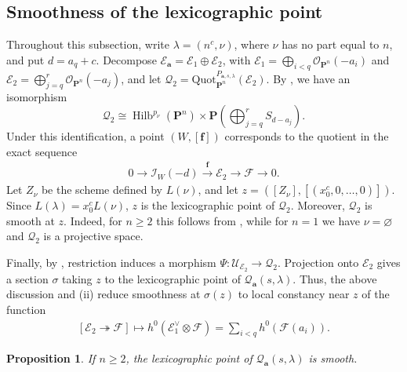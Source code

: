 \documentclass[leqno,11pt,a4paper]{amsart}
\newtheorem{prop}[prop]{Proposition}
\theoremstyle{definition}
\numberwithin{equation}{section}
\newcommand{\bfa}{\mathbf{a}}
\newcommand{\Quot}{\mathrm{Quot}}
\newcommand{\PP}{\mathbf{P}}
\newcommand{\bff}{\boldsymbol{f}}
\newcommand{\EE}{\mathscr{E}}
\newcommand{\FF}{\mathscr{F}}
\newcommand{\OO}{\mathscr{O}}
\newcommand{\II}{\mathscr{I}}
\newcommand{\QQ}{\mathcal{Q}}
\newcommand{\UU}{\mathcal{U}}
\DeclareMathOperator{\Hilb}{Hilb}
\begin{document}
\subsection{Smoothness of the lexicographic point}
Throughout this subsection, write $\lambda=(n^c,\nu)$, where $\nu$ has no part equal to $n$, and put $d=a_q+c$. 
Decompose $\EE_{\bfa}=\EE_1\oplus\EE_2$, with $\EE_1=\bigoplus_{i<q}\OO_{\PP^n}(-a_i)$ and $\EE_2=\bigoplus_{j=q}^r\OO_{\PP^n}(-a_j)$, and let $\QQ_2=\Quot_{\PP^n}^{P_{\bfa,s,\lambda}}(\EE_2)$.
By , we have an isomorphism
$$
\QQ_2\cong \Hilb^{p_\nu}(\PP^n)\times \PP\left(\bigoplus_{j=q}^r S_{d-a_j}\right).
$$
Under this identification, a point $(W,[\bff])$ corresponds to the quotient in the exact sequence
\begin{align} \label{quot_prod}
0\longrightarrow\II_W(-d) \xrightarrow{\bff}\EE_2 \longrightarrow\FF\longrightarrow0.
\end{align}
Let $Z_\nu$ be the scheme defined by $L(\nu)$, and let $z=([Z_\nu],[(x_0^c,0,\ldots,0)])$.
Since $L(\lambda)=x_0^cL(\nu)$, $z$ is the lexicographic point of $\QQ_2$.
Moreover, $\QQ_2$ is smooth at $z$. 
Indeed, for $n\geq2$ this follows from , while for $n=1$ we have $\nu=\varnothing$ and $\QQ_2$ is a projective space.

Finally, by , restriction induces a morphism $\Psi:\UU_{\EE_2}\to\QQ_2$.
Projection onto $\EE_2$ gives a section $\sigma$ taking $z$ to the lexicographic point of $\QQ_{\bfa}(s,\lambda)$. 
Thus, the above discussion and (ii) reduce smoothness at $\sigma(z)$ to local constancy near $z$ of the function
\begin{align}\label{function_const}
[\EE_2\twoheadrightarrow\FF] \longmapsto h^0(\EE_1^\vee\otimes\FF) =\sum_{i<q}h^0(\FF(a_i)).
\end{align}


\begin{prop}\label{lex_smooth}
If $n\geq2$, the lexicographic point of $\QQ_{\bfa}(s,\lambda)$ is smooth.
\end{prop}
\end{document}
